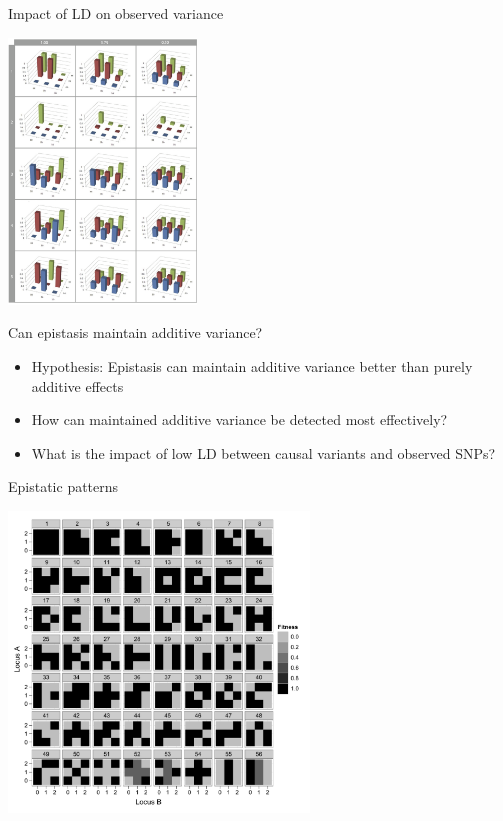 \documentclass{beamer}
\begin{document}
\begin{frame}{Impact of LD on observed variance}
\begin{center}
\includegraphics[width=5cm]{gpmaps_ld.png} \\
\end{center}
\end{frame}

\begin{frame}{Can epistasis maintain additive variance?}
\begin{itemize}
\item Hypothesis: Epistasis can maintain additive variance better than purely additive effects
\item How can maintained additive variance be detected most effectively?
\item What is the impact of low LD between causal variants and observed SNPs?
\end{itemize}
\end{frame}


\begin{frame}{Epistatic patterns}
\begin{center}
\includegraphics[width=8cm]{sup_gpmaps.pdf}
\end{center}
\end{frame}
\end{document}
